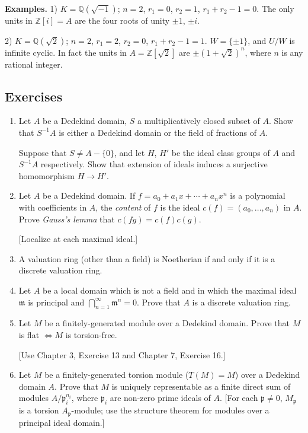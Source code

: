 \noindent\textbf{Examples.} 1) $K=\mathbb Q(\sqrt{-1})$; $n=2$, $r_1=0$, $r_2=1$, $r_1+r_2-1=0$. The only units in $\mathbb Z[i]=A$ are the four roots of unity $\pm1$, $\pm i$.

2) $K=\mathbb Q(\sqrt2)$; $n=2$, $r_1=2$, $r_2=0$, $r_1+r_2-1=1$. $W=\{\pm1\}$, and $U/W$ is infinite cyclic. In fact the units in $A=\mathbb Z[\sqrt2]$ are $\pm(1+\sqrt2)^n$, where $n$ is any rational integer.

\subsection{Exercises}

\begin{enumerate}
\item Let $A$ be a Dedekind domain, $S$ a multiplicatively closed subset of $A$. Show that $S^{-1}A$ is either a Dedekind domain or the field of fractions of $A$.

Suppose that $S\neq A-\{0\}$, and let $H$, $H'$ be the ideal class groups of $A$ and $S^{-1}A$ respectively. Show that extension of ideals induces a surjective homomorphism $H\longrightarrow H'$.

\item Let $A$ be a Dedekind domain. If $f=a_0+a_1x+\cdots+a_nx^n$ is a polynomial with coefficients in $A$, the \textit{content} of $f$ is the ideal $c(f)=(a_0,\ldots,a_n)$ in $A$. Prove \textit{Gauss's lemma} that $c(fg)=c(f)c(g)$.

[Localize at each maximal ideal.]

\item A valuation ring (other than a field) is Noetherian if and only if it is a discrete valuation ring.

\item Let $A$ be a local domain which is not a field and in which the maximal ideal $\mathfrak m$ is principal and $\bigcap_{n=1}^{\infty}\mathfrak m^n=0$. Prove that $A$ is a discrete valuation ring.

\item Let $M$ be a finitely-generated module over a Dedekind domain. Prove that $M$ is flat $\Longleftrightarrow M$ is torsion-free.

[Use Chapter 3, Exercise 13 and Chapter 7, Exercise 16.]

\item Let $M$ be a finitely-generated torsion module ($T(M)=M$) over a Dedekind domain $A$. Prove that $M$ is uniquely representable as a finite direct sum of modules $A/\mathfrak p_i^{n_i}$, where $\mathfrak p_i$ are non-zero prime ideals of $A$. [For each $\mathfrak p\neq0$, $M_{\mathfrak p}$ is a torsion $A_{\mathfrak p}$-module; use the structure theorem for modules over a principal ideal domain.]


\end{enumerate}
